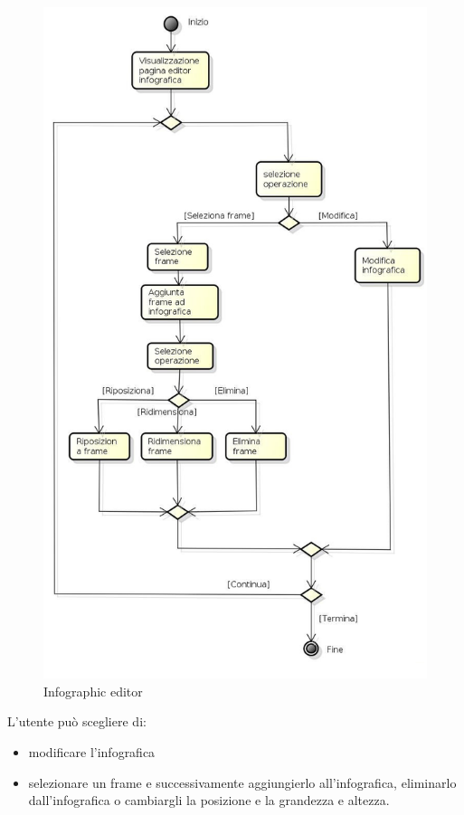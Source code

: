 \begin{figure}[h!]
		\centering
		\includegraphics[scale=.2]{img/Editor_infografica.jpg}
		\caption{Infographic editor}
		\label{fig:ModelloSpy}
\end{figure}

L'utente può scegliere di: 
\begin{itemize}
\item modificare l'infografica 
\item selezionare un frame e successivamente aggiungierlo all'infografica, eliminarlo dall'infografica o cambiargli la posizione e la grandezza e altezza.
\end{itemize}

